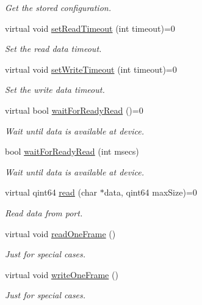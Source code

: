 \begin{DoxyCompactItemize}
\begin{DoxyCompactList}\small\item\em Get the stored configuration. \end{DoxyCompactList}\item 
virtual void \hyperlink{classmdt_abstract_port_a6589b04467e0073d18ba872201bdcd84}{setReadTimeout} (int timeout)=0
\begin{DoxyCompactList}\small\item\em Set the read data timeout. \end{DoxyCompactList}\item 
virtual void \hyperlink{classmdt_abstract_port_a12eb422d52ebb09a650f8497b258c2e7}{setWriteTimeout} (int timeout)=0
\begin{DoxyCompactList}\small\item\em Set the write data timeout. \end{DoxyCompactList}\item 
virtual bool \hyperlink{classmdt_abstract_port_a848e3c86aa6ec480e8c471655fbcf5c5}{waitForReadyRead} ()=0
\begin{DoxyCompactList}\small\item\em Wait until data is available at device. \end{DoxyCompactList}\item 
bool \hyperlink{classmdt_abstract_port_ae77785fbad938eac5f24f437e7683277}{waitForReadyRead} (int msecs)
\begin{DoxyCompactList}\small\item\em Wait until data is available at device. \end{DoxyCompactList}\item 
virtual qint64 \hyperlink{classmdt_abstract_port_a9d9c45220d5328c9856a2445557fe970}{read} (char $\ast$data, qint64 maxSize)=0
\begin{DoxyCompactList}\small\item\em Read data from port. \end{DoxyCompactList}\item 
virtual void \hyperlink{classmdt_abstract_port_ab1738b5b6b78743ee2d36ccf5daa7c00}{readOneFrame} ()
\begin{DoxyCompactList}\small\item\em Just for special cases. \end{DoxyCompactList}\item 
virtual void \hyperlink{classmdt_abstract_port_a2235d62d9a9e4555d41773c41cc3bc70}{writeOneFrame} ()
\begin{DoxyCompactList}\small\item\em Just for special cases. \end{DoxyCompactList}\item 

\end{DoxyCompactItemize}

